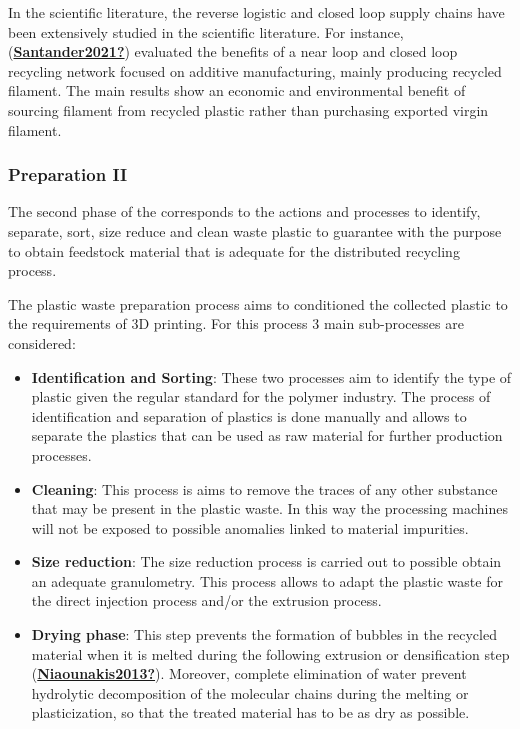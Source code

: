 \documentclass[
  11pt,
]{article}
\begin{document}
In the scientific literature, the reverse logistic and closed loop
supply chains have been extensively studied in the scientific
literature. For instance,
(\protect\hyperlink{ref-Santander2021}{\textbf{Santander2021?}})
evaluated the benefits of a near loop and closed loop recycling network
focused on additive manufacturing, mainly producing recycled filament.
The main results show an economic and environmental benefit of sourcing
filament from recycled plastic rather than purchasing exported virgin
filament.

\hypertarget{preparation-ii}{%
\subsubsection{Preparation II}\label{preparation-ii}}

The second phase of the corresponds to the actions and processes to
identify, separate, sort, size reduce and clean waste plastic to
guarantee with the purpose to obtain feedstock material that is adequate
for the distributed recycling process.

The plastic waste preparation process aims to conditioned the collected
plastic to the requirements of 3D printing. For this process 3 main
sub-processes are considered:

\begin{itemize}
\item
  \textbf{Identification and Sorting}: These two processes aim to
  identify the type of plastic given the regular standard for the
  polymer industry. The process of identification and separation of
  plastics is done manually and allows to separate the plastics that can
  be used as raw material for further production processes.
\item
  \textbf{Cleaning}: This process is aims to remove the traces of any
  other substance that may be present in the plastic waste. In this way
  the processing machines will not be exposed to possible anomalies
  linked to material impurities.
\item
  \textbf{Size reduction}: The size reduction process is carried out to
  possible obtain an adequate granulometry. This process allows to adapt
  the plastic waste for the direct injection process and/or the
  extrusion process.
\item
  \textbf{Drying phase}: This step prevents the formation of bubbles in
  the recycled material when it is melted during the following extrusion
  or densification step
  (\protect\hyperlink{ref-Niaounakis2013}{\textbf{Niaounakis2013?}}).
  Moreover, complete elimination of water prevent hydrolytic
  decomposition of the molecular chains during the melting or
  plasticization, so that the treated material has to be as dry as
  possible.
\end{itemize}
\end{document}
